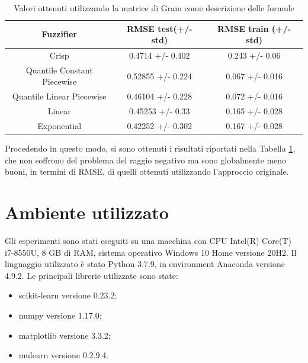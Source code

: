 \documentclass[12pt,a4paper]{report}
\begin{document}
\begin{table}[h!]
\small
\centering 	
	\begin{tabular}{|c|c|c|} 
	 \hline
	  Fuzzifier & RMSE test(+/- std) & RMSE train (+/- std)\\ [0.5ex] 
	 \hline
	 Crisp & 0.4714  +/- 0.402 & 0.243 +/- 0.06 \\ 
	 \hline
	 Quantile Constant Piecewise & 0.52855  +/- 0.224 & 0.067 +/- 0.016\\
	 \hline
	 Quantile Linear Piecewise & 0.46104  +/- 0.228	& 0.072 +/- 0.016\\
	 \hline
	 Linear &0.45253  +/- 0.33 & 0.165 +/- 0.028\\
	 \hline
	 Exponential & 0.42252  +/- 0.302 & 0.167 +/-  0.028\\ [1ex] 
	 \hline
	\end{tabular}
	\caption{Valori ottenuti utilizzando la matrice di Gram come descrizione delle formule}
	\label{table:risultatiVettore}
\end{table}

Procedendo in questo modo, si sono ottenuti i risultati riportati nella Tabella \ref{table:risultatiVettore}, che non soffrono del problema del raggio negativo ma sono globalmente meno buoni, in termini di RMSE, di quelli ottenuti utilizzando l'approccio originale.



\section{Ambiente utilizzato}
Gli esperimenti sono stati eseguiti su una macchina con CPU Intel(R) Core(T) i7-8550U, 8 GB di RAM, sistema operativo Windows 10 Home versione 20H2. 
Il linguaggio utilizzato è stato Python 3.7.9, in environment Anaconda \cite{anaconda} versione 4.9.2.
Le principali librerie utilizzate sono state:
\begin{itemize}
\item scikit-learn \cite{scikit-learn} versione 0.23.2;
\item numpy \cite{numpy} versione 1.17.0;
\item matplotlib \cite{matplotlib} versione 3.3.2;
\item mulearn \cite{mulearn} versione 0.2.9.4.
\end{itemize}
\end{document}
